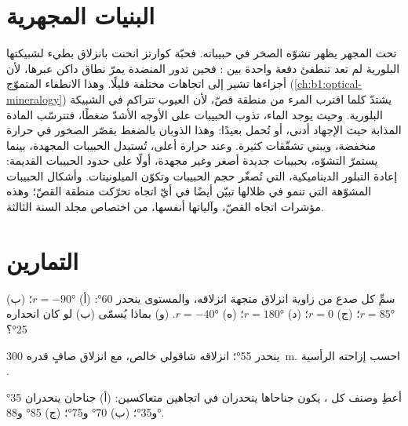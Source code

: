 \section{البنيات المجهرية}\label{sec:b1:faults-folds-fabrics:micro}

تحت المجهر يظهر تشوّه الصخر في حبيباته. فحبّة كوارتز انحنت بانزلاق بطيء لشبيكتها البلورية لم تعد تنطفئ دفعة واحدة بين : فحين تدور المنضدة يمرّ نطاق داكن عبرها، لأن أجزاءها تشير إلى اتجاهات مختلفة قليلًا. وهذا الانطفاء المتموّج (\cref{ch:b1:optical-mineralogy}) يشتدّ كلما اقترب المرء من منطقة قصّ، لأن العيوب تتراكم في الشبيكة البلورية. وحيث يوجد الماء، تذوب الحبيبات على الأوجه الأشدّ ضغطًا، فتترسّب المادة المذابة حيث الإجهاد أدنى، أو تُحمل بعيدًا: وهذا الذوبان بالضغط يقصّر الصخور في حرارة منخفضة، ويبني تشقّقات كثيرة. وعند حرارة أعلى، تُستبدل الحبيبات المجهدة، بينما يستمرّ التشوّه، بحبيبات جديدة أصغر وغير مجهدة، أولًا على حدود الحبيبات القديمة: إعادة التبلور الديناميكية، التي تُصغّر حجم الحبيبات وتكوّن الميلونيتات. وأشكال الحبيبات المشوّهة  التي تنمو في ظلالها تبيّن أيضًا في أيّ اتجاه تحرّكت منطقة القصّ؛ وهذه مؤشرات اتجاه القصّ، وآلياتها أنفسها، من اختصاص مجلد السنة الثالثة.

\section{التمارين}

\begin{exercise}[$\star$]\label{exo:b1:faults-folds-fabrics:1}
سمِّ كل صدع من زاوية انزلاق متجهة انزلاقه، والمستوى ينحدر \ang{60}:
(أ) $r = \ang{-90}$؛ (ب) $r = \ang{85}$؛ (ج) $r = 0$؛ (د) $r = \ang{180}$؛
(ه) $r = \ang{-40}$. (و) بماذا يُسمّى (ب) لو كان انحداره \ang{25}؟
\end{exercise}

\begin{exercise}[$\star$]\label{exo:b1:faults-folds-fabrics:2}
 ينحدر \ang{55}؛ انزلاقه شاقولي خالص، مع انزلاق صافٍ قدره \qty{300}{m}. احسب إزاحته الرأسية .
\end{exercise}

\begin{exercise}[$\star$]\label{exo:b1:faults-folds-fabrics:3}
أعطِ  وصنف كل ، يكون جناحاها ينحدران في اتجاهين متعاكسين: (أ) جناحان ينحدران \ang{35} و\ang{35}؛ (ب) \ang{70} و\ang{75}؛ (ج) \ang{85} و\ang{88}.
\end{exercise}

